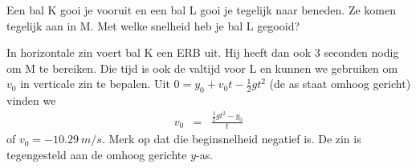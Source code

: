 


\item[6 p. 92]  
\begin{minipage}[t]{.5\textwidth}
Een bal K gooi je vooruit en een bal L gooi je tegelijk naar beneden. Ze komen tegelijk aan in M. Met welke snelheid heb je bal L gegooid?
\end{minipage}
\hfill
\begin{minipage}[t]{.4\textwidth}
	\raisebox{1ex-\height}{%
		\texttt{[image: 6p92]}} 
\end{minipage}
\begin{oplossing}
\newline
In horizontale zin voert bal K een ERB uit. Hij heeft dan ook 3 seconden nodig om M te bereiken. Die tijd is ook de valtijd voor L en kunnen we gebruiken om $v_0$ in verticale zin te bepalen. Uit $0=y_0+v_0t-\frac{1}{2}gt^2$ (de as staat omhoog gericht) vinden we 
\begin{eqnarray*}
v_0&=&\frac{\frac{1}{2}gt^2-y_0}{t}
\end{eqnarray*}
of $v_0=\SI{-10,29}{m/s}$. Merk op dat die beginsnelheid negatief is. De zin is tegengesteld aan de omhoog gerichte $y$-as.
\end{oplossing}